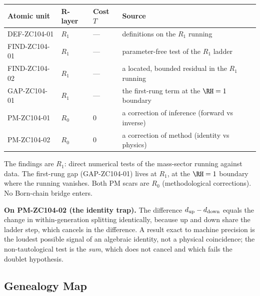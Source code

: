 \documentclass[12pt, a4paper]{article}
\begin{document}
\begin{layerbox}[title={R-Layer Assignments for ZC104}]
{\small\renewcommand{\arraystretch}{1.25}
\begin{center}
\begin{tabular}{@{}llll@{}}
\toprule
Atomic unit & R-layer & Cost $T$ & Source \\
\midrule
DEF-ZC104-01  & $R_1$ & --- & definitions on the $R_1$ running \\
FIND-ZC104-01 & $R_1$ & --- & parameter-free test of the $R_1$ ladder \\
FIND-ZC104-02 & $R_1$ & --- & a located, bounded residual in the $R_1$ running \\
GAP-ZC104-01  & $R_1$ & --- & the first-rung term at the $\RH=1$ boundary \\
PM-ZC104-01   & $R_0$ & $0$ & a correction of inference (forward vs inverse) \\
PM-ZC104-02   & $R_0$ & $0$ & a correction of method (identity vs physics) \\
\bottomrule
\end{tabular}
\end{center}}
The findings are $R_1$: direct numerical tests of the mass-sector running
against data. The first-rung gap (GAP-ZC104-01) lives at $R_1$, at the $\RH=1$
boundary where the running vanishes. Both PM scars are $R_0$ (methodological
corrections). No Born-chain bridge enters.

\textbf{On PM-ZC104-02 (the identity trap).} The difference
$d_{\rm up}-d_{\rm down}$ equals the change in within-generation splitting
identically, because up and down share the ladder step, which cancels in the
difference. A result exact to machine precision is the loudest possible signal of
an algebraic identity, not a physical coincidence; the non-tautological test is
the \emph{sum}, which does not cancel and which fails the doublet hypothesis.
\end{layerbox}

\subsection{Genealogy Map}
\label{sec:genealogy-zc104}
\end{document}
